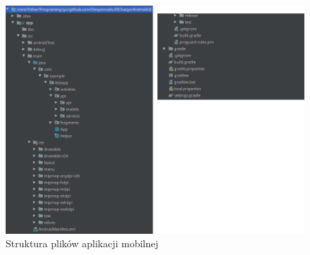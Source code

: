 \begin{figure}[ht]
\centering
\includegraphics[width=0.9\linewidth]{rys03/frontend_file_struct.png}
\caption{Struktura plików aplikacji mobilnej}
\label{fig:frontend_file_structure}
\end{figure}

